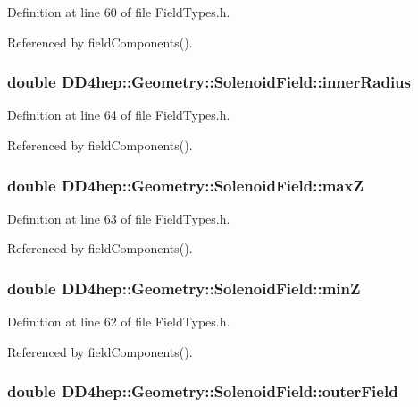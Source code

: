 Definition at line 60 of file FieldTypes.h.

Referenced by fieldComponents().\hypertarget{class_d_d4hep_1_1_geometry_1_1_solenoid_field_a76e7d98a12bae50393178361083ef37e}{
\subsubsection[{innerRadius}]{\setlength{\rightskip}{0pt plus 5cm}double {\bf DD4hep::Geometry::SolenoidField::innerRadius}}}
\label{class_d_d4hep_1_1_geometry_1_1_solenoid_field_a76e7d98a12bae50393178361083ef37e}


Definition at line 64 of file FieldTypes.h.

Referenced by fieldComponents().\hypertarget{class_d_d4hep_1_1_geometry_1_1_solenoid_field_aa38b5bc9144edd3b19a837c8c2473e96}{
\subsubsection[{maxZ}]{\setlength{\rightskip}{0pt plus 5cm}double {\bf DD4hep::Geometry::SolenoidField::maxZ}}}
\label{class_d_d4hep_1_1_geometry_1_1_solenoid_field_aa38b5bc9144edd3b19a837c8c2473e96}


Definition at line 63 of file FieldTypes.h.

Referenced by fieldComponents().\hypertarget{class_d_d4hep_1_1_geometry_1_1_solenoid_field_a51af6d29a975015b6f539d514ddc1000}{
\subsubsection[{minZ}]{\setlength{\rightskip}{0pt plus 5cm}double {\bf DD4hep::Geometry::SolenoidField::minZ}}}
\label{class_d_d4hep_1_1_geometry_1_1_solenoid_field_a51af6d29a975015b6f539d514ddc1000}


Definition at line 62 of file FieldTypes.h.

Referenced by fieldComponents().\hypertarget{class_d_d4hep_1_1_geometry_1_1_solenoid_field_a7a98e6f75ae53445e6b1dad2a4279ac9}{
\subsubsection[{outerField}]{\setlength{\rightskip}{0pt plus 5cm}double {\bf DD4hep::Geometry::SolenoidField::outerField}}}
\label{class_d_d4hep_1_1_geometry_1_1_solenoid_field_a7a98e6f75ae53445e6b1dad2a4279ac9}


